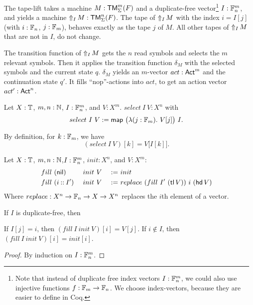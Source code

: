 The tape-lift takes a machine $M:\TM_\Sigma^m(F)$ and a duplicate-free vector\footnote{ Note that instead of duplicate free index vectors
  $I:\Fin_n^m$, we could also use injective functions $f: \Fin_m \to \Fin_n$.  We choose index-vectors, because they are easier to define in Coq.}
$I: \Fin_n^m$, and yields a machine $\LiftTapes{M}{I} : \TM_\Sigma^n(F)$.  The tape of $\LiftTapes{M}{I}$ with the index $i = I[j]$ (with $i:\Fin_n$,
$j:\Fin_m$), behaves exactly as the tape $j$ of $M$. All other tapes of $\LiftTapes{M}{I}$ that are not in $I$, do not change.


The transition function of $\LiftTapes{M}{I}$ gets the $n$ read symbols and selects the $m$ relevant symbols.  Then it applies the transition function
$\delta_M$ with the selected symbols and the current state $q$.  $\delta_M$ yields an $m$-vector $act:\Act^m$ and the continuation state $q'$.  It
fills ``nop''-actions into $act$, to get an action vector $act':\Act^n$.

\begin{definition}
  \label{def:select}
  Let $X:\Type$, $m,n:\Nat$, $I : \Fin_n^m$, and $V : X^m$.  $select~I~V : X^n$ with
  \[ select~I~V := \map{\bigl(\lambda (j:\Fin_m).~V[j] \bigr)}{I}. \]
\end{definition}
\begin{lemma}
  By definition, for $k:\Fin_m$, we have
  \[
    (select~I~V)[k]=V\bigl[I[k]\bigr].
  \]
\end{lemma}

\begin{definition}
  Let $X:\Type$, $m,n:\Nat$,$I:\Fin_n^m$, $init:X^n$, and $V:X^m$:
  \begin{alignat*}{3}
    & fill~(\nil      )&& ~init~V &~:=~& init \\
    & fill~(i \cons I')&& ~init~V &~:=~& replace~(fill~I'~(\tl V))~i~(\hd V)
  \end{alignat*}
  Where $replace : X^n \to \Fin_n \to X \to X^n$ replaces the $i$th element of a vector.
\end{definition}
\begin{lemma}
  If $I$ is duplicate-free, then
  \begin{enumerate}
   \label{lem:fill_correct_nth}
    If $I[j]=i$, then $(fill~I~init~V)[i] = V[j]$.
   \label{lem:fill_not_index}
    If $i \notin I$, then $(fill~I~init~V)[i] = init[i]$.
  \end{enumerate}
\end{lemma}
\begin{proof}
  By induction on $I : \Fin_n^m$.
\end{proof}

